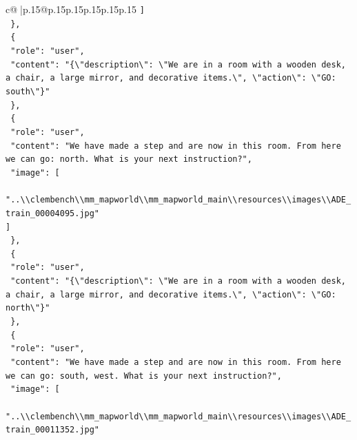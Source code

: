 \documentclass{article}
\begin{document}
{\begin{supertabular}{c@{$\;$}|p{.15\linewidth}@{}p{.15\linewidth}p{.15\linewidth}p{.15\linewidth}p{.15\linewidth}p{.15\linewidth}}
{{{\texttt{    {]}} \\
\texttt{  \},} \\
\texttt{  \{} \\
\texttt{    "role": "user",} \\
\texttt{    "content": "\{\textbackslash{}"description\textbackslash{}": \textbackslash{}"We are in a room with a wooden desk, a chair, a large mirror, and decorative items.\textbackslash{}", \textbackslash{}"action\textbackslash{}": \textbackslash{}"GO: south\textbackslash{}"\}"} \\
\texttt{  \},} \\
\texttt{  \{} \\
\texttt{    "role": "user",} \\
\texttt{    "content": "We have made a step and are now in this room. From here we can go: north. What is your next instruction?",} \\
\texttt{    "image": {[}} \\
\texttt{      "..\textbackslash{}\textbackslash{}clembench\textbackslash{}\textbackslash{}mm\_mapworld\textbackslash{}\textbackslash{}mm\_mapworld\_main\textbackslash{}\textbackslash{}resources\textbackslash{}\textbackslash{}images\textbackslash{}\textbackslash{}ADE\_train\_00004095.jpg"} \\
\texttt{    {]}} \\
\texttt{  \},} \\
\texttt{  \{} \\
\texttt{    "role": "user",} \\
\texttt{    "content": "\{\textbackslash{}"description\textbackslash{}": \textbackslash{}"We are in a room with a wooden desk, a chair, a large mirror, and decorative items.\textbackslash{}", \textbackslash{}"action\textbackslash{}": \textbackslash{}"GO: north\textbackslash{}"\}"} \\
\texttt{  \},} \\
\texttt{  \{} \\
\texttt{    "role": "user",} \\
\texttt{    "content": "We have made a step and are now in this room. From here we can go: south, west. What is your next instruction?",} \\
\texttt{    "image": {[}} \\
\texttt{      "..\textbackslash{}\textbackslash{}clembench\textbackslash{}\textbackslash{}mm\_mapworld\textbackslash{}\textbackslash{}mm\_mapworld\_main\textbackslash{}\textbackslash{}resources\textbackslash{}\textbackslash{}images\textbackslash{}\textbackslash{}ADE\_train\_00011352.jpg"} \\
}}}
\end{supertabular}}
\end{document}
